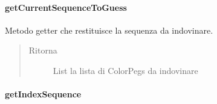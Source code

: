 \documentclass[letterpaper,10pt,italian]{sphinxmanual}
\begin{document}
\paragraph{getCurrentSequenceToGuess}
\label{\detokenize{source/it/unicam/cs/pa/mastermind/ui/InteractionView:getcurrentsequencetoguess}}

\begin{fulllineitems}
\label{\detokenize{source/it/unicam/cs/pa/mastermind/ui/InteractionView:it.unicam.cs.pa.mastermind.ui.InteractionView.getCurrentSequenceToGuess()}}
Metodo getter che restituisce la sequenza da indovinare.
\begin{quote}\begin{description}
\item[{Ritorna}] \leavevmode
List la lista di ColorPegs da indovinare

\end{description}\end{quote}

\end{fulllineitems}



\paragraph{getIndexSequence}
\label{\detokenize{source/it/unicam/cs/pa/mastermind/ui/InteractionView:getindexsequence}}
\end{document}
